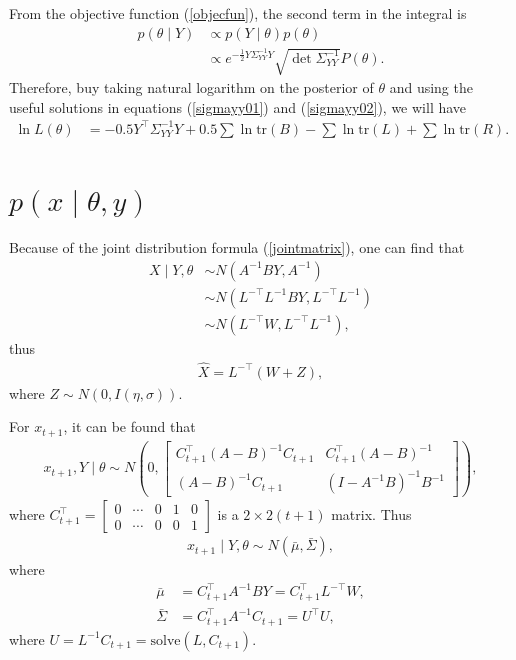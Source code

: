 From the objective function (\ref{objecfun}), the second term in the integral is
\begin{align*}
p(\theta \mid Y) &\propto p(Y\mid\theta)p(\theta)\\
&\propto e^{-\frac{1}{2} Y \Sigma_{YY}^{-1} Y } \sqrt{\det \Sigma_{YY}^{-1}} P(\theta).
\end{align*}
Therefore, buy taking natural logarithm on the posterior of $\theta$ and using the useful solutions in equations (\ref{sigmayy01}) and (\ref{sigmayy02}), we will have
\begin{align}\label{logL}
\ln L(\theta) &= -0.5Y^\top\Sigma_{YY}^{-1}Y+0.5\sum\ln\mbox{tr}(B)-\sum\ln\mbox{tr}(L)+\sum\ln\mbox{tr}(R).
\end{align}


\section{$p(x\mid \theta,y)$}

Because of the joint distribution formula (\ref{jointmatrix}), one can find that
\begin{align*}
X \mid Y,\theta &\sim N \left( A^{-1}BY, A^{-1} \right) \\
&\sim N(L^{-\top}L^{-1}BY,L^{-\top}L^{-1})\\
&\sim N(L^{-\top}W,L^{-\top}L^{-1}),
\end{align*}
thus
\begin{align*}
\hat{X} = L^{-\top}(W+Z),
\end{align*}
where $Z \sim N(0, I(\eta,\sigma))$.

For $x_{t+1}$, it can be found that
\begin{align*}
x_{t+1}, Y\mid \theta \sim N\left( 0, \begin{bmatrix}
C_{t+1}^\top(A-B) ^{-1}C_{t+1} & C_{t+1}^\top (A-B)^{-1}\\
(A-B)^{-1}C_{t+1} & (I- A^{-1}B) ^{-1}B^{-1}
\end{bmatrix} \right),
\end{align*}
where $C_{t+1}^\top = \begin{bmatrix}
0 & \cdots & 0 & 1 & 0 \\
0 & \cdots & 0 & 0 & 1
\end{bmatrix}$ is a $2 \times 2(t+1)$ matrix. Thus
\begin{align*}
x_{t+1}\mid Y,\theta \sim N(\bar{\mu},\bar{\Sigma}),
\end{align*}
where
\begin{align*}
\bar{\mu} & = C_{t+1}^\top A^{-1}BY =C_{t+1}^\top L^{-\top}W,\\
\bar{\Sigma} & =C_{t+1}^\top A^{-1}C_{t+1} =U^\top U,
\end{align*}
where $U = L^{-1} C_{t+1} = \mbox{solve}(L,C_{t+1})$.

